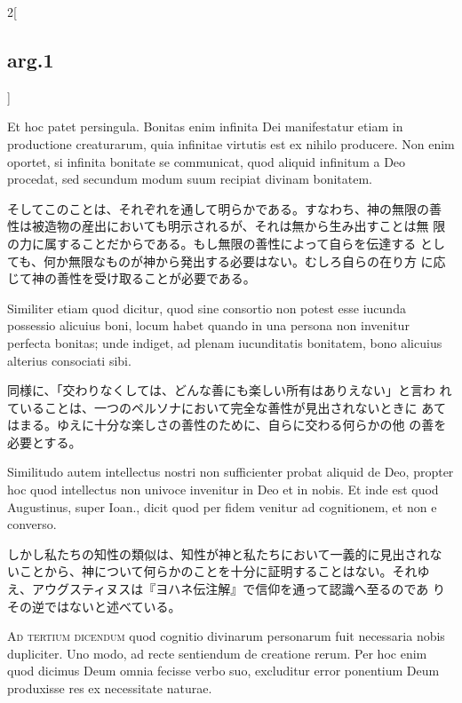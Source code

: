 \documentclass[paper=a4paper,fontsize=10pt,jafontsize=9pt,titlepage]{jlreq}
\begin{document}
\begin{paracol}{2}[\subsection{arg.1}]
\switchcolumn*

Et hoc patet persingula. 
Bonitas enim infinita Dei manifestatur etiam in productione
creaturarum, quia infinitae virtutis est ex nihilo producere. Non enim
oportet, si infinita bonitate se communicat, quod aliquid infinitum a
Deo procedat, sed secundum modum suum recipiat divinam
bonitatem.

\switchcolumn

そしてこのことは、それぞれを通して明らかである。すなわち、神の無限の善
 性は被造物の産出においても明示されるが、それは無から生み出すことは無
 限の力に属することだからである。もし無限の善性によって自らを伝達する
としても、何か無限なものが神から発出する必要はない。むしろ自らの在り方
 に応じて神の善性を受け取ることが必要である。

\switchcolumn*

Similiter etiam quod dicitur, quod sine consortio non
potest esse iucunda possessio alicuius boni, locum habet quando in una
persona non invenitur perfecta bonitas; unde indiget, ad plenam
iucunditatis bonitatem, bono alicuius alterius consociati
sibi.

\switchcolumn

同様に、「交わりなくしては、どんな善にも楽しい所有はありえない」と言わ
 れていることは、一つのペルソナにおいて完全な善性が見出されないときに
 あてはまる。ゆえに十分な楽しさの善性のために、自らに交わる何らかの他
 の善を必要とする。

\switchcolumn*

Similitudo autem intellectus nostri non sufficienter probat
aliquid de Deo, propter hoc quod intellectus non univoce invenitur in
Deo et in nobis. Et inde est quod Augustinus, super Ioan., dicit quod
per fidem venitur ad cognitionem, et non e converso.

\switchcolumn

しかし私たちの知性の類似は、知性が神と私たちにおいて一義的に見出されな
 いことから、神について何らかのことを十分に証明することはない。それゆ
 え、アウグスティヌスは『ヨハネ伝注解』で信仰を通って認識へ至るのであ
 りその逆ではないと述べている。

\switchcolumn*[\subsection{ad.3}]

{\scshape Ad tertium dicendum} quod cognitio divinarum personarum fuit necessaria
nobis dupliciter. Uno modo, ad recte sentiendum de creatione
rerum. Per hoc enim quod dicimus Deum omnia fecisse verbo suo,
excluditur error ponentium Deum produxisse res ex necessitate
naturae.


\end{paracol}
\end{document}
